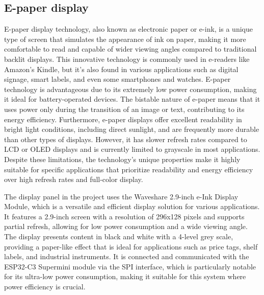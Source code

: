 \documentclass[../Main.tex]{subfiles}
\begin{document}
\subsection{E-paper display}
E-paper display technology, also known as electronic paper or e-ink, is a unique type of screen that simulates the appearance of ink on paper, making it more comfortable to read and capable of wider viewing angles compared to traditional backlit displays. This innovative technology is commonly used in e-readers like Amazon's Kindle, but it's also found in various applications such as digital signage, smart labels, and even some smartphones and watches\cite{ynvisible}. E-paper technology is advantageous due to its extremely low power consumption, making it ideal for battery-operated devices. The bistable nature of e-paper means that it uses power only during the transition of an image or text, contributing to its energy efficiency. Furthermore, e-paper displays offer excellent readability in bright light conditions, including direct sunlight, and are frequently more durable than other types of displays. However, it has slower refresh rates compared to LCD or OLED displays and is currently limited to grayscale in most applications. Despite these limitations, the technology's unique properties make it highly suitable for specific applications that prioritize readability and energy efficiency over high refresh rates and full-color display.

The display panel in the project uses the Waveshare 2.9-inch e-Ink Display Module, which is a versatile and efficient display solution for various applications. It features a 2.9-inch screen with a resolution of 296x128 pixels and supports partial refresh, allowing for low power consumption and a wide viewing angle. The display presents content in black and white with a 4-level grey scale, providing a paper-like effect that is ideal for applications such as price tags, shelf labels, and industrial instruments. It is connected and communicated with the ESP32-C3 Supermini module via the SPI interface, which is particularly notable for its ultra-low power consumption, making it suitable for this system where power efficiency is crucial.
\end{document}
